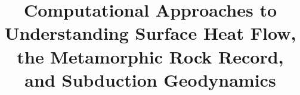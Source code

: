 \usepackage[noprefix,intoc]{nomencl}
  \makenomenclature
  



  \title{Computational Approaches to Understanding Surface Heat Flow, the Metamorphic Rock Record, and Subduction Geodynamics}

\renewcommand{\contentsname}{Table of contents}

\def\maketitle{
  \cleardoublepage
  \begin{titlepage}
    \pagenumbering{roman}
    \begin{center}
        {\huge Computational Approaches to Understanding Surface Heat Flow, the Metamorphic Rock Record, and Subduction Geodynamics \par}
        \vspace*{0.5in}

        {by\\}
        {Buchanan C. Kerswell}
        \vspace*{1in}

        A dissertation\\
        submitted in partial fulfillment \\
        of the requirements for the degree of\\
        Doctor of Philosophy~in~Geosciences\\
        Boise State University
        \vspace*{0.5in}

        November 2021
    \end{center}
  \end{titlepage}
  \let\maketitle\relax
}

